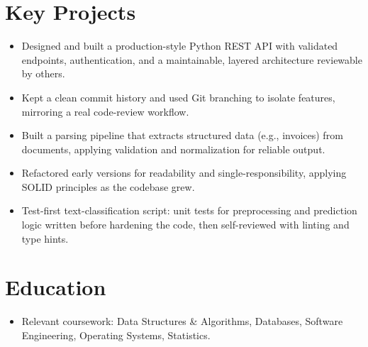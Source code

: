 \documentclass[10pt]{article}
\begin{document}
\section{Key Projects}

\begin{itemize}
  \item Designed and built a production-style Python REST API with validated endpoints, authentication, and a maintainable, layered architecture reviewable by others.
  \item Kept a clean commit history and used Git branching to isolate features, mirroring a real code-review workflow.
\end{itemize}

\begin{itemize}
  \item Built a parsing pipeline that extracts structured data (e.g., invoices) from documents, applying validation and normalization for reliable output.
  \item Refactored early versions for readability and single-responsibility, applying SOLID principles as the codebase grew.
\end{itemize}

\begin{itemize}
  \item Test-first text-classification script: unit tests for preprocessing and prediction logic written before hardening the code, then self-reviewed with linting and type hints.
\end{itemize}

\section{Education}
\begin{itemize}
  \item Relevant coursework: Data Structures \& Algorithms, Databases, Software Engineering, Operating Systems, Statistics.
\end{itemize}
\end{document}
